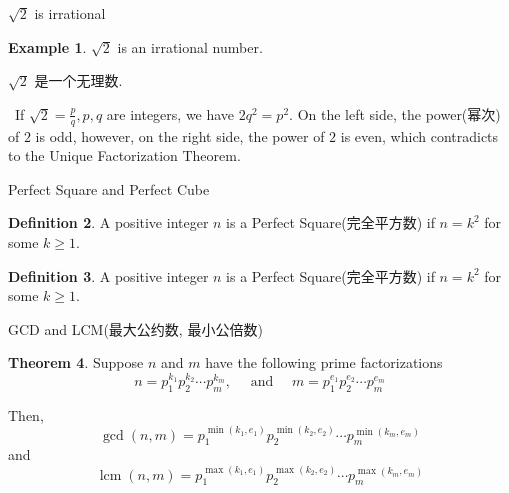 \documentclass{beamer}
\theoremstyle{definition}
\newtheorem{defn}{Definition}[section]
\newtheorem{theo}[defn]{Theorem}
\newtheorem{exam}[defn]{Example}
\newenvironment{prooff}{{\noindent\it\textcolor{cyan!40!black}{Proof}:}\,}{\par}
\begin{document}
\begin{frame}{$\sqrt{2}$ is irrational}
    \begin{exam}
        $\sqrt{2}$ is an irrational number.

        $\sqrt{2}$ 是一个无理数.
    \end{exam}
    \begin{prooff}
        If $\sqrt{2}=\frac{p}{q},p,q$ are integers, we have $2q^2=p^2$. On the left side, the power(幂次) of $2$ is odd, however,
        on the right side, the power of $2$ is even,
        which contradicts to the  Unique Factorization Theorem.
    \end{prooff}
\end{frame}
\begin{frame}{Perfect Square and Perfect Cube}
    \begin{defn}
        A positive integer $n$ is a Perfect Square(完全平方数) if $n=k^2$ for some $k\ge 1$.
    \end{defn}
    \begin{defn}
        A positive integer $n$ is a Perfect Square(完全平方数) if $n=k^2$ for some $k\ge 1$.
    \end{defn}
\end{frame}
\begin{frame}{GCD and LCM(最大公约数, 最小公倍数)}
    \begin{theo}
        Suppose $n$ and $m$ have the following prime factorizations
        $$
            n=p_1^{k_1} p_2^{k_2} \cdots p_m^{k_m}, \quad \text { and } \quad m=p_1^{e_1} p_2^{e_2} \cdots p_m^{e_m}
        $$

        Then,
        $$
            \operatorname{gcd}(n, m)=p_1^{\min \left(k_1, e_1\right)} p_2^{\min \left(k_2, e_2\right)} \cdots p_m^{\min \left(k_m, e_m\right)}
        $$
        and
        $$
            \operatorname{lcm}(n, m)=p_1^{\max \left(k_1, e_1\right)} p_2^{\max \left(k_2, e_2\right)} \cdots p_m^{\max \left(k_m, e_m\right)}
        $$
    \end{theo}
\end{frame}
\end{document}
